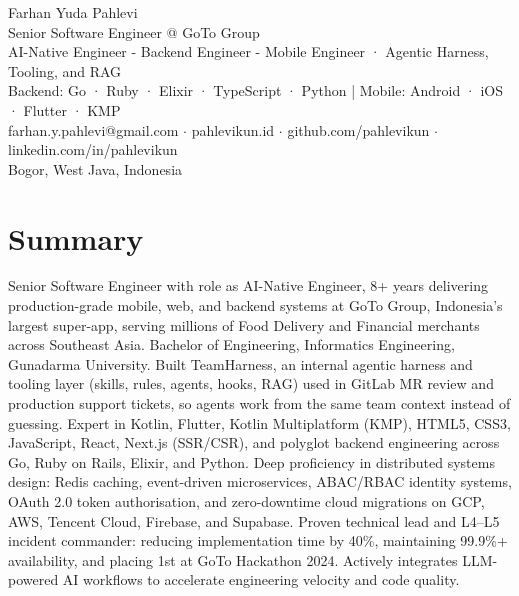 \documentclass[11pt]{article}
\begin{document}
{\LARGE Farhan Yuda Pahlevi}\\
{\large Senior Software Engineer @ GoTo Group}\\
{\large AI-Native Engineer - Backend Engineer - Mobile Engineer · Agentic Harness, Tooling, and RAG}\\
Backend: Go · Ruby · Elixir · TypeScript · Python | Mobile: Android · iOS · Flutter · KMP\\
farhan.y.pahlevi@gmail.com $\cdot$ pahlevikun.id $\cdot$ github.com/pahlevikun $\cdot$ linkedin.com/in/pahlevikun\\
Bogor, West Java, Indonesia\\

\section*{Summary}
Senior Software Engineer with role as AI-Native Engineer, 8+ years delivering production-grade mobile, web, and backend systems at GoTo Group, Indonesia's largest super-app, serving millions of Food Delivery and Financial merchants across Southeast Asia. Bachelor of Engineering, Informatics Engineering, Gunadarma University. Built TeamHarness, an internal agentic harness and tooling layer (skills, rules, agents, hooks, RAG) used in GitLab MR review and production support tickets, so agents work from the same team context instead of guessing. Expert in Kotlin, Flutter, Kotlin Multiplatform (KMP), HTML5, CSS3, JavaScript, React, Next.js (SSR/CSR), and polyglot backend engineering across Go, Ruby on Rails, Elixir, and Python. Deep proficiency in distributed systems design: Redis caching, event-driven microservices, ABAC/RBAC identity systems, OAuth 2.0 token authorisation, and zero-downtime cloud migrations on GCP, AWS, Tencent Cloud, Firebase, and Supabase. Proven technical lead and L4–L5 incident commander: reducing implementation time by 40\%, maintaining 99.9\%+ availability, and placing 1st at GoTo Hackathon 2024. Actively integrates LLM-powered AI workflows to accelerate engineering velocity and code quality.
\end{document}
